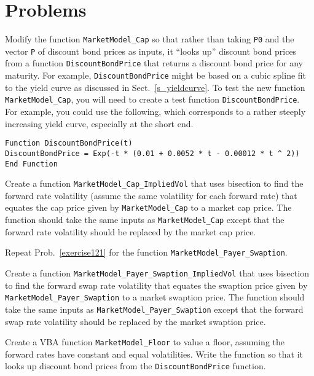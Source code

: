 \section*{Problems}
\begin{prob} \label{exercise121} Modify the function \verb!MarketModel_Cap! so that rather than taking \verb!P0! and the vector \verb!P! of discount bond prices as inputs, it ``looks up'' discount bond prices from a function \verb!DiscountBondPrice! that returns a discount bond price for any maturity.  For example, \verb!DiscountBondPrice! might be based on a cubic spline fit to the yield curve as discussed in Sect.~\ref{s_yieldcurve}.  To test the new function \verb!MarketModel_Cap!, you will need to create a test function \verb!DiscountBondPrice!.  For example, you could use the following, which corresponds to a rather steeply increasing yield curve, especially at the short end.
\small\begin{verbatim}
Function DiscountBondPrice(t)
DiscountBondPrice = Exp(-t * (0.01 + 0.0052 * t - 0.00012 * t ^ 2))
End Function
\end{verbatim}\normalsize
\end{prob}\begin{prob} Create a function \verb!MarketModel_Cap_ImpliedVol! that uses bisection to find the forward rate volatility (assume the same volatility for each forward rate) that equates the cap price given by \verb!MarketModel_Cap! to a market cap price.  The function should take the same inputs as \verb!MarketModel_Cap! except that the forward rate volatility should be replaced by the market cap price.
\end{prob}\begin{prob} Repeat Prob.~\ref{exercise121} for the function \verb!MarketModel_Payer_Swaption!.
\end{prob}\begin{prob} Create a function \verb!MarketModel_Payer_Swaption_ImpliedVol! that uses bisection to find the forward swap rate volatility that equates the swaption price given by \verb!MarketModel_Payer_Swaption! to a market swaption price.  The function should take the same inputs as \verb!MarketModel_Payer_Swaption! except that the forward swap rate volatility should be replaced by the market swaption price.
\end{prob}\begin{prob} Create a VBA function \verb!MarketModel_Floor! to value a floor, assuming the forward rates have constant and equal volatilities.  Write the function so that it looks up discount bond prices from the \verb!DiscountBondPrice! function. 

\end{prob}
